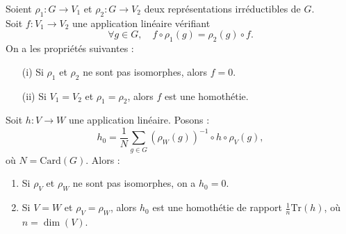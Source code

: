 \documentclass[9pt]{beamer}
\begin{document}
\begin{frame}
\begin{theorem} 
	Soient \( \rho_1 : G \rightarrow V_1 \) et \( \rho_2 : G \rightarrow V_2 \) deux représentations irréductibles de \( G \). \\
	Soit \( f : V_1 \rightarrow V_2 \) une application linéaire vérifiant
	\[
	\forall g \in G, \quad f \circ \rho_1(g) = \rho_2(g) \circ f.
	\]
	On a les propriétés suivantes :
	\begin{enumerate} [label=\roman*)]
		\item[(i)] Si \( \rho_1 \) et \( \rho_2 \) ne sont pas isomorphes, alors \( f = 0 \).
		\item[(ii)] Si \(V_1 = V_2 \) et \( \rho_1 = \rho_2 \), alors \( f \) est une homothétie.
	\end{enumerate}
\end{theorem}

\begin{corollary}
	Soit \( h  : V \to W \) une application linéaire. Posons :
	\[
	h_0 = \frac{1}{N} \sum_{g \in G} (\rho_W(g))^{-1} \circ h \circ \rho_V(g),
	\]
	où \( N = \mathrm{Card}(G) \).
	Alors :
	\begin{enumerate}[label=\roman*)]
		\item Si \( \rho_V \) et \( \rho_W \) ne sont pas isomorphes, on a \( h_0 = 0 \).
		\item Si \( V = W \) et \( \rho_V = \rho_W \), alors \( h_0 \) est une homothétie de rapport \( \frac{1}{n} \text{Tr}(h) \), où \( n = \dim(V) \).
	\end{enumerate}
\end{corollary}
\end{frame}
\end{document}
